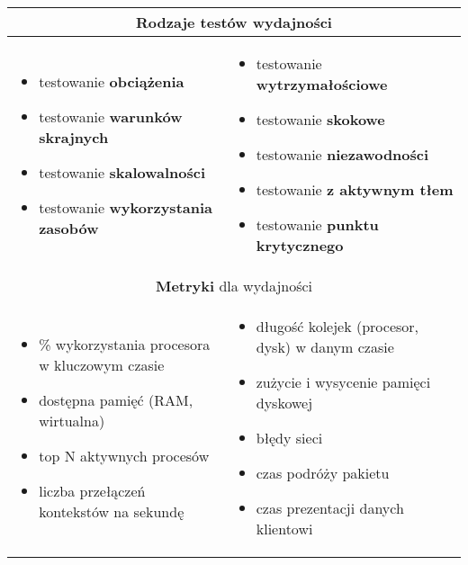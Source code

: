 \documentclass[../main.tex]{subfiles}
\begin{document}
    \begin{table}[H]
        \begin{center}
            \begin{tabular}{| p{8cm} | p{8cm} |}
                \hline
                \multicolumn{2}{|c|}{\textbf{Rodzaje testów} wydajności} \\
                \hline
                \begin{itemize}
                    \item testowanie \textbf{obciążenia}
                    \item testowanie \textbf{warunków skrajnych}
                    \item testowanie \textbf{skalowalności}
                    \item testowanie \textbf{wykorzystania zasobów}
                \end{itemize}
                &
                \begin{itemize}
                    \item testowanie \textbf{wytrzymałościowe}
                    \item testowanie \textbf{skokowe}
                    \item testowanie \textbf{niezawodności}
                    \item testowanie \textbf{z aktywnym tłem}
                    \item testowanie \textbf{punktu krytycznego}
                \end{itemize} \\
                \hline
                \hline
                \multicolumn{2}{|c|}{\textbf{Metryki} dla wydajności} \\
                \hline
                \begin{itemize}
                    \item \% wykorzystania procesora w kluczowym czasie
                    \item dostępna pamięć (RAM, wirtualna)
                    \item top N aktywnych procesów
                    \item liczba przełączeń kontekstów na sekundę
                \end{itemize}
                &
                \begin{itemize}
                    \item długość kolejek (procesor, dysk) w danym czasie
                    \item zużycie i wysycenie pamięci dyskowej
                    \item błędy sieci
                    \item czas podróży pakietu
                    \item czas prezentacji danych klientowi
                \end{itemize} \\
                \hline

            \end{tabular}
        \end{center}
    \end{table}
\end{document}
